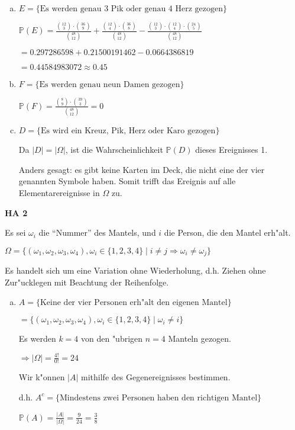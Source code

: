 \documentclass[a4paper,12pt]{article}
\newcommand{\Aufgabe}[1]{
        {
        \vspace*{0.5cm}
        \textbf{HA #1}
        \vspace*{0.2cm}
    }
}
\begin{document}
\begin{enumerate}[(a)]
        \item
        $ E = \{\text{Es werden genau 3 Pik oder genau 4 Herz gezogen}\} $

        $ \displaystyle \mathbb{P}(E) = \frac{\binom{12}{3} \cdot \binom{36}{9}}{\binom{48}{12}} + \frac{\binom{12}{4} \cdot \binom{36}{8}}{\binom{48}{12}} - \frac{\binom{12}{3} \cdot \binom{12}{4} \cdot \binom{24}{5}}{\binom{48}{12}} $

        $ = 0.297286598 + 0.21500191462 - 0.0664386819 $

        $ = 0.44584983072 \approx 0.45 $

        \item
        $ F = \{\text{Es werden genau neun Damen gezogen}\} $

        $ \displaystyle \mathbb{P}(F) = \frac{\binom{8}{9} \cdot \binom{39}{3}}{\binom{48}{12}} = 0 $

        \item
        $ D = \{\text{Es wird ein Kreuz, Pik, Herz oder Karo gezogen}\} $

        Da $ |D| = |\Omega| $, ist die Wahrscheinlichkeit $ \mathbb{P}(D) $ dieses Ereignisses 1.

        Anders gesagt: es gibt keine Karten im Deck, die nicht eine der vier genannten Symbole haben. 
        Somit trifft das Ereignis auf alle Elementarereignisse in $ \Omega $ zu.
    \end{enumerate}

    \Aufgabe{2}
    
    Es sei $ \omega_i $ die ``Nummer'' des Mantels, und $ i $ die Person, die den Mantel erh"alt.

    $ \Omega = \{(\omega_1, \omega_2, \omega_3, \omega_4), \omega_i \in \{1, 2, 3, 4\} \mid i \neq j \Rightarrow \omega_i \neq \omega_j\} $

    \bigskip

    Es handelt sich um eine Variation ohne Wiederholung, d.h. Ziehen ohne Zur"ucklegen mit Beachtung der Reihenfolge.

    \begin{enumerate}[(a)]
        \item 
        $ A = \{\text{Keine der vier Personen erh"alt den eigenen Mantel}\} $

        $ = \{(\omega_1, \omega_2, \omega_3, \omega_4), \omega_i \in \{1, 2, 3, 4\} \mid \omega_i \neq i\} $

        Es werden $ k = 4 $ von den "ubrigen $ n = 4 $ Manteln gezogen.

        $ \displaystyle \Rightarrow |\Omega| = \frac{4!}{0!} = 24 $

        Wir k"onnen $ |A| $ mithilfe des Gegenereignisses bestimmen.

        d.h. $ A^c = \{\text{Mindestens zwei Personen haben den richtigen Mantel}\} $

        $ \displaystyle \mathbb{P}(A) = \frac{|A|}{|\Omega|} = \frac{9}{24} = \frac{3}{8} $

    \end{enumerate}
\end{document}
